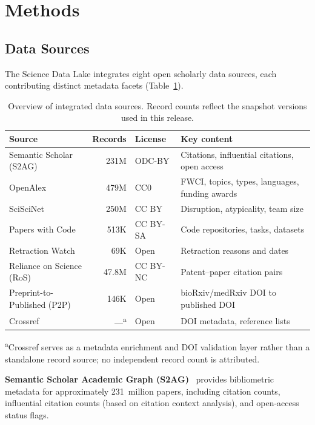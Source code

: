\section{Methods}
\label{sec:methods}

\subsection{Data Sources}
\label{sec:sources}

The Science Data Lake integrates eight open scholarly data sources, each contributing
distinct metadata facets (Table~\ref{tab:sources}).

\begin{table}[t]
\centering
\caption{Overview of integrated data sources. Record counts reflect the snapshot
versions used in this release.}
\label{tab:sources}
\small
\begin{tabularx}{\textwidth}{@{}l r l X@{}}
\toprule
\textbf{Source} & \textbf{Records} & \textbf{License} & \textbf{Key content} \\
\midrule
Semantic Scholar (S2AG)     & 231M  & ODC-BY   & Citations, influential citations, open access \\
OpenAlex                    & 479M  & CC0      & FWCI, topics, types, languages, funding awards \\
SciSciNet                   & 250M  & CC BY    & Disruption, atypicality, team size \\
Papers with Code            & 513K  & CC BY-SA & Code repositories, tasks, datasets \\
Retraction Watch            & 69K   & Open     & Retraction reasons and dates \\
Reliance on Science (RoS)   & 47.8M & CC BY-NC & Patent--paper citation pairs \\
Preprint-to-Published (P2P) & 146K  & Open     & bioRxiv/medRxiv DOI to published DOI \\
Crossref                    & ---\textsuperscript{a}   & Open     & DOI metadata, reference lists \\
\bottomrule
\end{tabularx}
\vspace{2pt}
{\footnotesize \textsuperscript{a}Crossref serves as a metadata enrichment and DOI validation layer rather than a standalone record source; no independent record count is attributed.}
\end{table}

\textbf{Semantic Scholar Academic Graph (S2AG)}~\cite{kinney2023s2ag} provides
bibliometric metadata for approximately 231~million papers, including citation counts,
influential citation counts (based on citation context analysis), and open-access
status flags.

